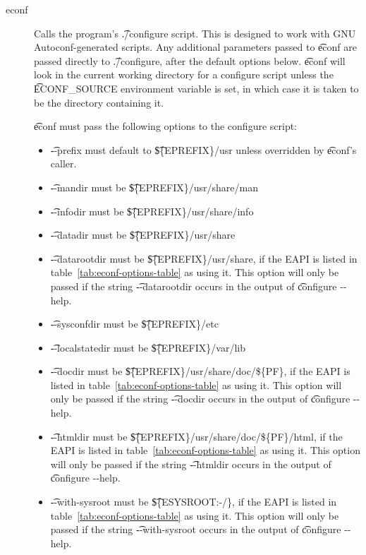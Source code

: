 \begin{description}
\item[econf] Calls the program's \t{./configure} script. This is designed to work with GNU
    Autoconf-generated scripts. Any additional parameters passed to \t{econf} are passed directly
    to \t{./configure}, after the default options below. \t{econf} will look in the current working
    directory for a configure script unless the \t{ECONF_SOURCE} environment variable is set,
    in which case it is taken to be the directory containing it.

     \t{econf} must pass the following options to the configure script:
    \begin{itemize}
    \item \t{-{}-prefix} must default to \t{\$\{EPREFIX\}/usr} unless overridden by \t{econf}'s
        caller.
    \item \t{-{}-mandir} must be \t{\$\{EPREFIX\}/usr/share/man}
    \item \t{-{}-infodir} must be \t{\$\{EPREFIX\}/usr/share/info}
    \item \t{-{}-datadir} must be \t{\$\{EPREFIX\}/usr/share}
    \item \t{-{}-datarootdir} must be \t{\$\{EPREFIX\}/usr/share}, if the EAPI is listed in
        table~\ref{tab:econf-options-table} as using it. This option will only be passed if the
        string \t{-{}-datarootdir} occurs in the output of \t{configure -{}-help}.
    \item \t{-{}-sysconfdir} must be \t{\$\{EPREFIX\}/etc}
    \item \t{-{}-localstatedir} must be \t{\$\{EPREFIX\}/var/lib}
    \item \t{-{}-docdir} must be \t{\$\{EPREFIX\}/usr/share/doc/\$\{PF\}}, if the EAPI is listed in
        table~\ref{tab:econf-options-table} as using it. This option will only be passed if the
        string \t{-{}-docdir} occurs in the output of \t{configure -{}-help}.
    \item \t{-{}-htmldir} must be \t{\$\{EPREFIX\}/usr/share/doc/\$\{PF\}/html}, if the EAPI is
        listed in table~\ref{tab:econf-options-table} as using it. This option will only be passed
        if the string \t{-{}-htmldir} occurs in the output of \t{configure -{}-help}.
    \item \t{-{}-with-sysroot} must be \t{\$\{ESYSROOT:-/\}}, if the EAPI is listed in
        table~\ref{tab:econf-options-table} as using it. This option will only be passed if the
        string \t{-{}-with-sysroot} occurs in the output of \t{configure -{}-help}.

\end{itemize}
\end{description}
